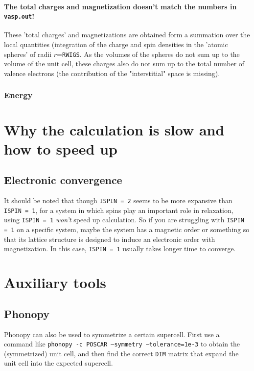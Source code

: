 \documentclass[hyperref, a4paper]{article}
\begin{document}
\paragraph{The total charges and magnetization doesn't match the numbers in \texttt{vasp.out}!}

These 'total charges' and magnetizations are obtained form a summation over the local quantities (integration of the charge and spin densities in the 'atomic spheres' of radii $r$=\texttt{RWIGS}. 
As the volumes of the spheres do not sum up to the volume of the unit cell, these charges also do not sum up to the total number of valence electrons (the contribution of the "interstitial" space is missing).

\subsubsection{Energy}

\section{Why the calculation is slow and how to speed up}

\subsection{Electronic convergence}

It should be noted that though \texttt{ISPIN = 2} seems to be more expansive than \texttt{ISPIN = 1}, for a system in which spins play an important role in relaxation, using \texttt{ISPIN = 1} \emph{won't} speed up calculation.
So if you are struggling with \texttt{ISPIN = 1} on a specific system, maybe the system has a magnetic order or something so that its lattice structure is designed to induce an electronic order with magnetization.
In this case, \texttt{ISPIN = 1} usually takes longer time to converge.

\section{Auxiliary tools}

\subsection{Phonopy}

Phonopy can also be used to symmetrize a certain supercell.
First use a command like \texttt{phonopy -c POSCAR --symmetry --tolerance=1e-3} to obtain the (symmetrized) unit cell, and then find the correct \texttt{DIM} matrix that expand the unit cell into the expected supercell.
\end{document}
